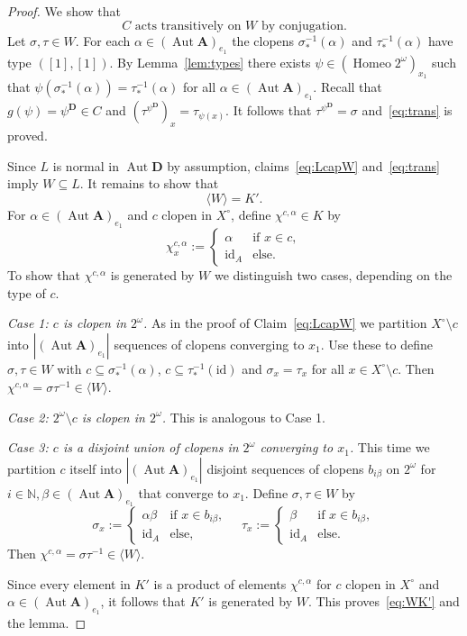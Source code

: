 \documentclass[12pt,a4paper,reqno]{amsart}
\numberwithin{equation}{section}
\theoremstyle{plain}
\theoremstyle{definition}
\newcommand{\A}{\mathbf{A}}
\newcommand{\D}{\mathbf{D}}
\newcommand{\id}{\mathrm{id}}
\newcommand{\N}{\mathbb{N}}
\DeclareMathOperator{\Aut}{Aut}
\DeclareMathOperator{\Homeo}{Homeo}
\begin{document}
\begin{proof}
 We show that 
\begin{equation} \label{eq:trans}
 C \text{ acts transitively on } W \text{ by conjugation}.
\end{equation}   
 Let $\sigma,\tau\in W$. For each $\alpha\in(\Aut\A)_{e_1}$ the clopens
 $\sigma_*^{-1}(\alpha)$ and $\tau_*^{-1}(\alpha)$
 have type $([1],[1])$.
 By Lemma~\ref{lem:types} there exists $\psi\in(\Homeo 2^\omega)_{x_1}$ such that
 $\psi(\sigma_*^{-1}(\alpha)) = \tau_*^{-1}(\alpha)$ for all  $\alpha\in(\Aut\A)_{e_1}$.
 Recall that $g(\psi)=\psi^\D\in C$ and $(\tau^{\psi^\D})_x = \tau_{\psi(x)}$. 
 It follows that $\tau^{\psi^\D} = \sigma$ and~\eqref{eq:trans} is proved.

 Since $L$ is normal in $\Aut\D$ by assumption, claims~\eqref{eq:LcapW} and~\eqref{eq:trans} imply $W\subseteq L$.
 It remains to show that
\begin{equation} \label{eq:WK'}
 \langle W \rangle = K'.
\end{equation}   
 For $\alpha\in(\Aut\A)_{e_1}$ and $c$ clopen in $X^\circ$, define $\chi^{c,\alpha}\in K$ by
\[ \chi^{c,\alpha}_x := \begin{cases} \alpha & \text{if } x\in c, \\ \id_A & \text{else.} \end{cases} \]
 To show that $\chi^{c,\alpha}$ is generated by $W$ we distinguish two cases, depending on the type of $c$.
\medskip

\textit{Case 1: $c$ is clopen in $2^\omega$.}
 As in the proof of Claim~\eqref{eq:LcapW} we partition $X^\circ \setminus c$ into $|(\Aut\A)_{e_1}|$ sequences of clopens converging to
 $x_1$. Use these to define $\sigma,\tau\in W$ with $c\subseteq\sigma_*^{-1}(\alpha)$,
 $c\subseteq\tau_*^{-1}(\id)$ and $\sigma_x = \tau_x$ for all $x\in X^{\circ}\setminus c$.
 Then $\chi^{c,\alpha} = \sigma\tau^{-1} \in\langle W\rangle$.
 \medskip
 
 \textit{Case 2: $2^\omega\setminus c$ is clopen in $2^\omega$.}
 This is analogous to Case 1.
 \medskip
 
 \textit{Case 3: $c$ is a disjoint union of clopens in $2^\omega$ converging to $x_1$.}
 This time we partition $c$ itself into $|(\Aut\A)_{e_1}|$ disjoint sequences of clopens $b_{i\beta}$ on $2^\omega$ for
 $i\in\N,\beta\in(\Aut\A)_{e_1}$ that converge to $x_1$. 
 Define $\sigma,\tau\in W$ by
\[
 \sigma_x := \begin{cases} \alpha\beta & \text{if } x\in b_{i\beta},\\
   \id_A & \text{else}, \end{cases}
 \quad \tau_x := \begin{cases} \beta & \text{if } x\in b_{i\beta},\\
   \id_A & \text{else}. \end{cases}
\]
 Then $\chi^{c,\alpha} = \sigma\tau^{-1} \in\langle W\rangle$.

 Since every element in $K'$ is a product of elements $\chi^{c,\alpha}$ for $c$ clopen in $X^\circ$ and
 $\alpha\in(\Aut\A)_{e_1}$, it follows that $K'$ is generated by $W$.
 This proves~\eqref{eq:WK'} and the lemma. 
\end{proof}
\end{document}
